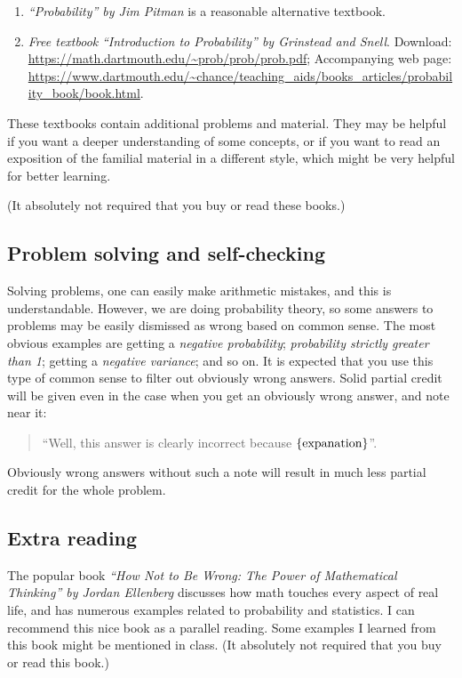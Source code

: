 \documentclass[oneside,11pt]{amsart}
\begin{document}
\begin{enumerate}
	\item 
		\emph{``Probability'' by Jim Pitman} is a reasonable alternative textbook.
	\item 
		\emph{Free textbook} 
		\emph{``Introduction to Probability'' by Grinstead and Snell}.
			Download: \url{https://math.dartmouth.edu/~prob/prob/prob.pdf};
			Accompanying web page: \url{https://www.dartmouth.edu/~chance/teaching_aids/books_articles/probability_book/book.html}.
\end{enumerate}

These textbooks contain additional problems and material.
They may be helpful if you want a deeper understanding of
some concepts, or if you want to read an exposition of the
familial material in a different style, which might be very
helpful for better learning.

(It absolutely not required that you buy or read these books.)

\subsection{Problem solving and self-checking}
\label{sub:problem_solving}

Solving problems, one can easily make arithmetic mistakes,
and this is understandable. However, 
we are doing probability theory, so some answers to problems
may be easily dismissed as wrong
based on common sense. 
The most obvious examples are 
getting a \emph{negative probability}; \emph{probability strictly greater than 1};
getting a \emph{negative variance}; and so on.
It is expected that you use this type of common sense to filter out 
obviously wrong answers.
Solid partial credit will be given even in the case when you get an obviously
wrong answer, and note near it:
\begin{quote}
	``Well, this answer is clearly incorrect because $\{\textnormal{expanation}\}$''.
\end{quote}
Obviously wrong answers without such a note 
will result in much less partial credit for the whole problem.

\subsection{Extra reading}

The popular book
\emph{``How Not to Be Wrong: The Power of Mathematical Thinking'' by Jordan Ellenberg}
discusses how math touches every aspect of real life, and has 
numerous examples related to probability and statistics. 
I can recommend this nice book as a parallel reading. Some
examples I learned from this book might be mentioned in class.
(It absolutely not required that you buy or read this book.)
\end{document}
